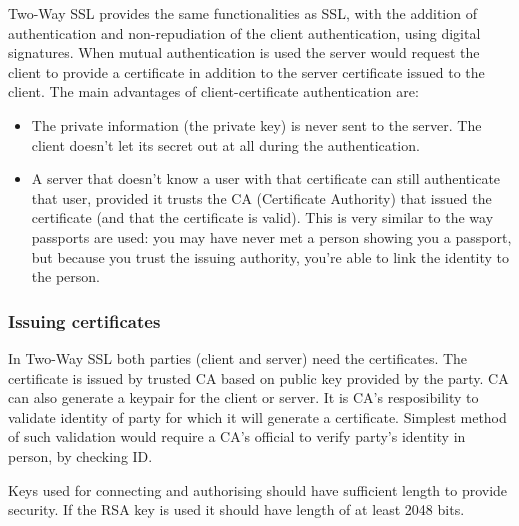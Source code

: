 Two-Way SSL provides the same functionalities as SSL, with the addition of authentication and non-repudiation of the client authentication, using digital signatures. When mutual authentication is used the server would request the client to provide a certificate in addition to the server certificate issued to the client.
The main advantages of client-certificate authentication are:
\begin{itemize}
\item The private information (the private key) is never sent to the server. The client doesn't let its secret out at all during the authentication.
\item A server that doesn't know a user with that certificate can still authenticate that user, provided it trusts the CA (Certificate Authority) that issued the certificate (and that the certificate is valid). This is very similar to the way passports are used: you may have never met a person showing you a passport, but because you trust the issuing authority, you're able to link the identity to the person.
\end{itemize}

\subsubsection{Issuing certificates}
In Two-Way SSL both parties (client and server) need the certificates. The certificate is issued by trusted CA based on public key provided by the party. CA can also generate a keypair for the client or server. It is CA's resposibility to validate identity of party for which it will generate a certificate. Simplest method of such validation would require a CA's official to verify party's identity in person, by checking ID.

Keys used for connecting and authorising should have sufficient length to provide security. If the RSA key is used it should have length of at least 2048 bits. 

